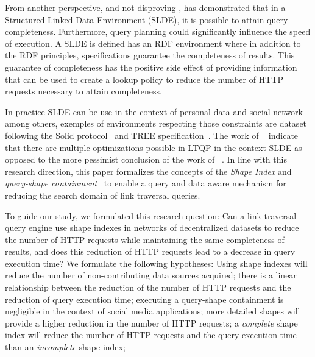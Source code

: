 From another perspective, and not disproving \citeauthor{hartig2016walking}, \citeauthor{Taelman2023} has demonstrated that in a Structured Linked Data Environment (SLDE),
it is possible to attain query completeness.
Furthermore, query planning could significantly influence the speed of execution.
A SLDE is defined has an RDF environment where in addition to the RDF principles, specifications
guarantee the completeness of results.
This guarantee of completeness has the positive side effect of providing information
that can be used to create a lookup policy to reduce the number of HTTP requests necessary to attain completeness.

In practice SLDE can be use in the context of personal data and social network among others,
exemples of environments respecting those constraints are dataset following the Solid protocol~\cite{Taelman2023} and TREE specification~\cite{tam_iswc_traversalsensortree_2024}.
The work of ~\citeauthor{Taelman2023} indicate that there are multiple optimizations possible in LTQP in the context SLDE as opposed to the
more pessimist conclusion of the work of ~\citeauthor{hartig2016walking}.
In line with this research direction, this paper formalizes the concepts of the \emph{Shape Index} and \emph{query-shape containment}~\cite{tam2024opportunitiesshapebasedoptimizationlink} to enable a query and data aware mechanism for reducing the search domain of link traversal queries.
\iffalse
The shape index concept relies on RDF data shapes; the conceptual idea of RDF data shapes is to describe the properties of an entity.
We propose to use them in an index to describe decentralized datasets.
Because shapes and queries share similarities, we propose transforming shapes into queries to perform a query containment problem
and assist our source selection.
\fi
To guide our study, we formulated this research question:
Can a link traversal query engine use shape indexes in networks of decentralized datasets to reduce the number of HTTP requests while maintaining the same completeness of results, and does this reduction of HTTP requests lead to a decrease in query execution time?
We formulate the following hypotheses:
Using shape indexes will reduce the number of non-contributing data sources acquired;
there is a linear relationship between the reduction of the number of HTTP requests and the reduction of query execution time;
executing a query-shape containment is negligible in the context of social media applications; 
more detailed shapes will provide a higher reduction in the number of HTTP requests;
a \emph{complete} shape index will reduce the number of HTTP requests and the query execution time than an \emph{incomplete} shape index;

